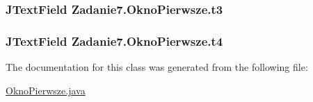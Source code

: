 \subsubsection[{\texorpdfstring{t3}{t3}}]{\setlength{\rightskip}{0pt plus 5cm}J\+Text\+Field Zadanie7.\+Okno\+Pierwsze.\+t3\hspace{0.3cm}{\ttfamily [package]}}\hypertarget{class_zadanie7_1_1_okno_pierwsze_a7ab2f446b910b4a42d04e6d43dcbfc72}{}\label{class_zadanie7_1_1_okno_pierwsze_a7ab2f446b910b4a42d04e6d43dcbfc72}
\subsubsection[{\texorpdfstring{t4}{t4}}]{\setlength{\rightskip}{0pt plus 5cm}J\+Text\+Field Zadanie7.\+Okno\+Pierwsze.\+t4\hspace{0.3cm}{\ttfamily [package]}}\hypertarget{class_zadanie7_1_1_okno_pierwsze_a23c1fb6015afadc86ce249d59d2d9543}{}\label{class_zadanie7_1_1_okno_pierwsze_a23c1fb6015afadc86ce249d59d2d9543}


The documentation for this class was generated from the following file\+:\begin{DoxyCompactItemize}
\item 
\hyperlink{_okno_pierwsze_8java}{Okno\+Pierwsze.\+java}\end{DoxyCompactItemize}
